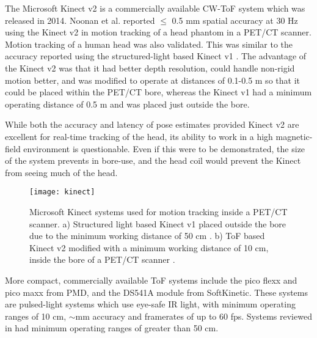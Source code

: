 \documentclass[class=article, crop=false]{standalone}
\begin{document}
\par 
The Microsoft Kinect v2 is a commercially available CW-ToF system which was released in 2014. Noonan et al. \parencite*{Noonan2015} reported $\leq$ 0.5 mm spatial accuracy at 30 Hz using the Kinect v2 in motion tracking of a head phantom in a PET/CT scanner. Motion tracking of a human head was also validated. This was similar to the accuracy reported using the structured-light based Kinect v1 \parencite{Noonan2012}. The advantage of the Kinect v2 was that it had better depth resolution, could handle non-rigid motion better, and was modified to operate at distances of 0.1-0.5 m so that it could be placed within the PET/CT bore, whereas the Kinect v1 had a minimum operating distance of 0.5 m and was placed just outside the bore. 
\par 
While both the accuracy and latency of pose estimates provided Kinect v2 are excellent for real-time tracking of the head, its ability to work in a high magnetic-field environment is questionable. Even if this were to be demonstrated, the size of the system prevents in bore-use, and the head coil would prevent the Kinect from seeing much of the head.

\begin{figure}[!h]
	\centering
	\texttt{[image: kinect]}
	\caption{Microsoft Kinect systems used for motion tracking inside a PET/CT scanner. a) Structured light based Kinect v1 placed outside the bore due to the minimum working distance of 50 cm \parencite{Noonan2012}. b) ToF based Kinect v2 modified with a minimum working distance of 10 cm, inside the bore of a PET/CT scanner \parencite{Noonan2015}.}
	\label{kinect}
\end{figure}

\par 
More compact, commercially available ToF systems include the pico flexx and pico maxx from PMD, and the DS541A module from SoftKinetic. These systems are pulsed-light systems which use eye-safe IR light, with minimum operating ranges of 10 cm, $\sim$mm accuracy and framerates of up to 60 fps. Systems reviewed in \parencite{Horaud2016} had minimum operating ranges of greater than 50 cm.
\end{document}
